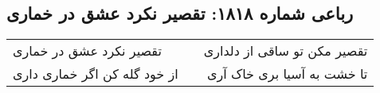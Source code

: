 \begin{center}
\section*{رباعی شماره ۱۸۱۸: تقصیر نکرد عشق در خماری}
\label{sec:1818}
\begin{longtable}{l p{0.5cm} r}
تقصیر نکرد عشق در خماری
&&
تقصیر مکن تو ساقی از دلداری
\\
از خود گله کن اگر خماری داری
&&
تا خشت به آسیا بری خاک آری
\\
\end{longtable}
\end{center}
